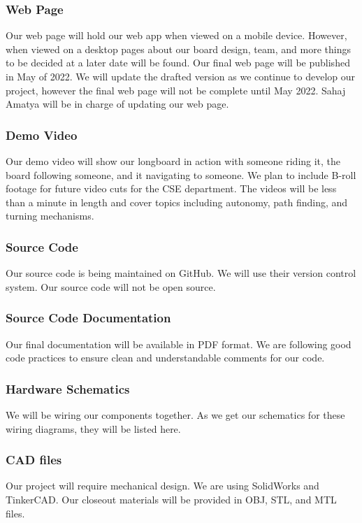 \subsubsection{Web Page}
Our web page will hold our web app when viewed on a mobile device. However, when viewed on a desktop pages about our board design, team, and more things to be decided at a later date will be found. Our final web page will be published in May of 2022. We will update the drafted version as we continue to develop our project, however the final web page will not be complete until May 2022. Sahaj Amatya will be in charge of updating our web page.

\subsubsection{Demo Video}
Our demo video will show our longboard in action with someone riding it, the board following someone, and it navigating to someone. We plan to include B-roll footage for future video cuts for the CSE department. The videos will be less than a minute in length and cover topics including autonomy, path finding, and turning mechanisms.

\subsubsection{Source Code}
Our source code is being maintained on GitHub. We will use their version control system. Our source code will not be open source.

\subsubsection{Source Code Documentation}
Our final documentation will be available in PDF format. We are following good code practices to ensure clean and understandable comments for our code.

\subsubsection{Hardware Schematics}
We will be wiring our components together. As we get our schematics for these wiring diagrams, they will be listed here.

\subsubsection{CAD files}
Our project will require mechanical design. We are using SolidWorks and TinkerCAD.
Our closeout materials will be provided in OBJ, STL, and MTL files.

